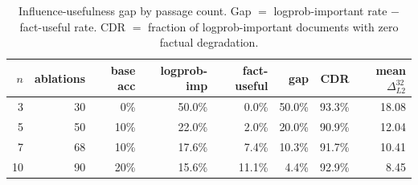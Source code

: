 \begin{table}[h]
\centering\small
\begin{tabular}{rrrrrrrr}
\toprule
$n$ & ablations & base acc & logprob-imp & fact-useful & gap & CDR & mean $\Delta_{L2}^{32}$ \\
\midrule
  3 & 30 & 0\% & 50.0\% & 0.0\% & 50.0\% & 93.3\% & 18.08 \\
  5 & 50 & 10\% & 22.0\% & 2.0\% & 20.0\% & 90.9\% & 12.04 \\
  7 & 68 & 10\% & 17.6\% & 7.4\% & 10.3\% & 91.7\% & 10.41 \\
  10 & 90 & 20\% & 15.6\% & 11.1\% & 4.4\% & 92.9\% & 8.45 \\
\bottomrule
\end{tabular}
\caption{Influence-usefulness gap by passage count. Gap $=$ logprob-important rate $-$ fact-useful rate. CDR $=$ fraction of logprob-important documents with zero factual degradation.}
\label{tab:e5_passage_gap}
\end{table}
